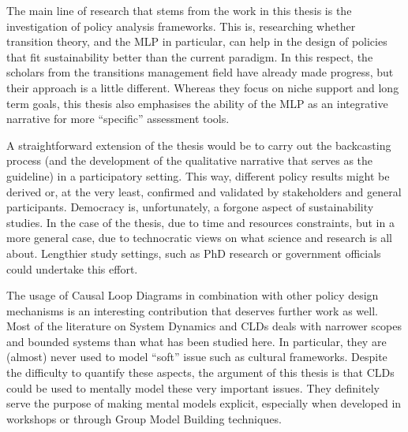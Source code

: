 The main line of research that stems from the work in this thesis is the investigation of policy analysis frameworks. This is, researching whether transition theory, and the MLP in particular, can help in the design of policies that fit sustainability better than the current paradigm. In this respect, the scholars from the transitions management field have already made progress, but their approach is a little different. Whereas they focus on niche support and long term goals, this thesis also emphasises the ability of the MLP as an integrative narrative for more ``specific'' assessment tools.

A straightforward extension of the thesis would be to carry out the backcasting process (and the development of the qualitative narrative that serves as the guideline) in a participatory setting. This way, different policy results might be derived or, at the very least, confirmed and validated by stakeholders and general participants. Democracy is, unfortunately, a forgone aspect of sustainability studies. In the case of the thesis, due to time and resources constraints, but in a more general case, due to technocratic views on what science and research is all about. Lengthier study settings, such as PhD research or government officials could undertake this effort.

The usage of Causal Loop Diagrams in combination with other policy design mechanisms is an interesting contribution that deserves further work as well. Most of the literature on System Dynamics and CLDs deals with narrower scopes and bounded systems than what has been studied here. In particular, they are (almost) never used to model ``soft'' issue such as cultural frameworks. Despite the difficulty to quantify these aspects, the argument of this thesis is that CLDs could be used to mentally model these very important issues. They definitely serve the purpose of making mental models explicit, especially when developed in workshops or through Group Model Building techniques.